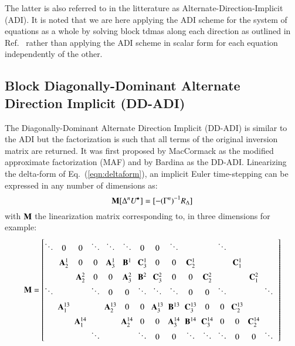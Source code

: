 \documentclass{warpdoc}
\newcommand{\alb}{\vspace{0.2cm}\\} %
\newcommand{\M}{{\bf M}}
\newcommand{\B}{{\bf B}}
\newcommand{\A}{{\bf A}}
\newcommand{\C}{{\bf C}}
\newcommand{\Ustar}{U^{\!\star}}
\begin{document}
The latter is also referred to in the litterature as Alternate-Direction-Implicit (ADI). It is noted that we are here applying the ADI scheme for the system of equations as a whole by solving block tdmas along each direction as outlined in Ref.\ \cite{jcp:1980:briley} rather than applying the ADI scheme in scalar form for each equation independently of the other.


\subsection{Block Diagonally-Dominant Alternate Direction Implicit (DD-ADI)}

The Diagonally-Dominant Alternate Direction Implicit (DD-ADI) is similar to the ADI
but the factorization is such that all terms of the original inversion matrix
are returned. It was first proposed by MacCormack \cite{aiaaconf:1997:maccormack}
as the  modified approximate factorization (MAF) and by Bardina \cite{aiaaconf:1987:bardina} as the DD-ADI.
Linearizing the delta-form of Eq.~(\ref{eqn:deltaform}),
an implicit Euler time-stepping can be expressed in any number of dimensions as:
%
\begin{equation}
  \M [ \Delta^n \Ustar ] = [- {(\Gamma^n)}^{-1} R_{\Delta}]
\end{equation}
%
with $\M$ the linearization matrix corresponding to, in three dimensions for
example:
%
\begin{equation}
\M=
 \left[
   \begin{array}{@{}c@{\;\;}c@{\;\;}c@{\;\;}c@{\;\;}c@{\;\;}c@{\;\;}c@{\;\;}c@{\;\;}c@{\;\;}c@{\;\;}c@{\;\;}c@{\;\;}c@{\;\;}c@{\;\;}c@{\;\;}c@{\;\;}c@{\;\;}c@{\;\;}c@{\;\;}c@{\;\;}c@{\;\;}c@{}}
   \ddots &  0     &  0   & \ddots   &\ddots   & \ddots   & 0     &  0   &\ddots   &      &    &\ddots    &    &     &      \alb
       &\A_2^1    &  0   &     0  &\A_3^1   &\B^1      & \C_3^1  & 0    &   0   &\C_2^1  &    &    &\C_1^1 &     &      \alb
    &       &\A_2^2  &   0    &    0  &\A_3^2    & \B^2    &\C_3^2  &   0   &  0   &\C_2^2 &    &    & \C_1^2 &      \\
   \ddots &    &  &\ddots    &  0    &    0   &\ddots   &\ddots  &\ddots   &   0  &  0  &\ddots  & &  & \ddots  \alb
       &\A_1^{13} &     &    &\A_2^{13}&0 & 0 &\A_3^{13}&\B^{13} &\C_3^{13}& 0    & 0   &\C_2^{13}&     &      \alb
       &       &\A_1^{14}&   &      &\A_2^{14} &   0   &  0   &\A_3^{14}&\B^{14}   & \C_3^{14} &0&0& \C_2^{14}&     \\
       &       &     &\ddots    &      &       &\ddots   &  0   &   0   &\ddots&\ddots   & \ddots &0&0&\ddots\\
   \end{array}
 \right]
\end{equation}
\end{document}
